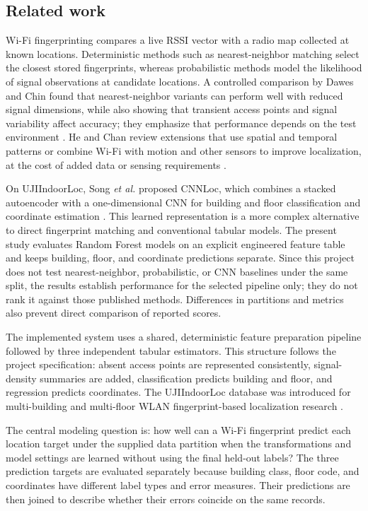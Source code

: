 \documentclass[conference]{IEEEtran}
\begin{document}
\subsection{Related work}
Wi-Fi fingerprinting compares a live RSSI vector with a radio map collected at known locations. Deterministic methods such as nearest-neighbor matching select the closest stored fingerprints, whereas probabilistic methods model the likelihood of signal observations at candidate locations. A controlled comparison by Dawes and Chin found that nearest-neighbor variants can perform well with reduced signal dimensions, while also showing that transient access points and signal variability affect accuracy; they emphasize that performance depends on the test environment \cite{dawes2011}. He and Chan review extensions that use spatial and temporal patterns or combine Wi-Fi with motion and other sensors to improve localization, at the cost of added data or sensing requirements \cite{hechan2016}.

On UJIIndoorLoc, Song \emph{et al.} proposed CNNLoc, which combines a stacked autoencoder with a one-dimensional CNN for building and floor classification and coordinate estimation \cite{song2019}. This learned representation is a more complex alternative to direct fingerprint matching and conventional tabular models. The present study evaluates Random Forest models on an explicit engineered feature table and keeps building, floor, and coordinate predictions separate. Since this project does not test nearest-neighbor, probabilistic, or CNN baselines under the same split, the results establish performance for the selected pipeline only; they do not rank it against those published methods. Differences in partitions and metrics also prevent direct comparison of reported scores.

The implemented system uses a shared, deterministic feature preparation pipeline followed by three independent tabular estimators. This structure follows the project specification: absent access points are represented consistently, signal-density summaries are added, classification predicts building and floor, and regression predicts coordinates. The UJIIndoorLoc database was introduced for multi-building and multi-floor WLAN fingerprint-based localization research \cite{torres2014,uci}.

The central modeling question is: how well can a Wi-Fi fingerprint predict each location target under the supplied data partition when the transformations and model settings are learned without using the final held-out labels? The three prediction targets are evaluated separately because building class, floor code, and coordinates have different label types and error measures. Their predictions are then joined to describe whether their errors coincide on the same records.
\end{document}
